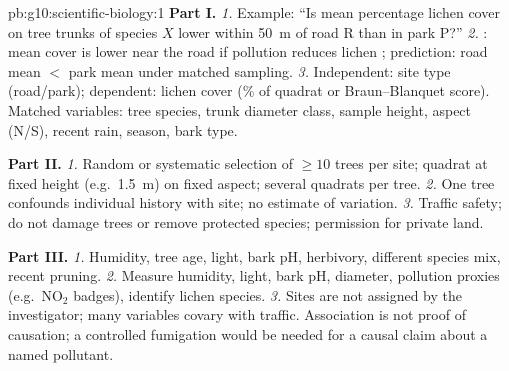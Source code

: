 \begin{solution}{pb:g10:scientific-biology:1}
\textbf{Part I.}
\emph{1.} Example: ``Is mean percentage lichen cover on tree trunks of
species $X$ lower within \qty{50}{m} of road R than in park P?''
\emph{2.} : mean cover is lower near the road if pollution
reduces lichen ; prediction: road mean $<$ park mean under matched
sampling.
\emph{3.} Independent: site type (road/park); dependent: lichen cover
(\% of quadrat or Braun--Blanquet score). Matched variables: tree
species, trunk diameter class, sample height, aspect (N/S), recent rain,
season, bark type.

\textbf{Part II.}
\emph{1.} Random or systematic selection of $\ge 10$ trees per site;
quadrat at fixed height (e.g.\ \qty{1.5}{m}) on fixed aspect; several
quadrats per tree.
\emph{2.} One tree confounds individual history with site; no estimate of
variation.
\emph{3.} Traffic safety; do not damage trees or remove protected
species; permission for private land.

\textbf{Part III.}
\emph{1.} Humidity, tree age, light, bark pH, herbivory, different species
mix, recent pruning.
\emph{2.} Measure humidity, light, bark pH, diameter, pollution proxies
(e.g.\ NO$_2$ badges), identify lichen species.
\emph{3.} Sites are not assigned by the investigator; many variables
covary with traffic. Association is not proof of causation; a controlled
fumigation  would be needed for a causal claim about a named
pollutant.
\end{solution}
